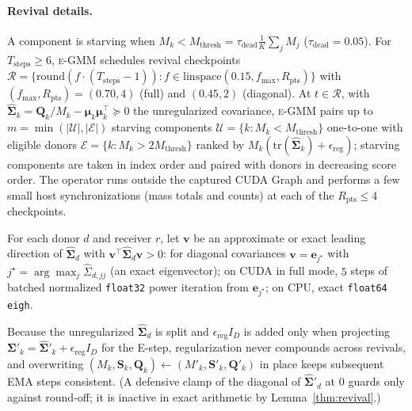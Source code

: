 \documentclass[10pt]{article} %
\newcommand{\egmm}{\textsc{e-GMM}}
\newcommand{\tr}{\mathrm{tr}}
\begin{document}
\paragraph{Revival details.} A component is starving when $M_k < M_{\mathrm{thresh}} = \tau_{\mathrm{dead}} \frac{1}{K}\sum_{j} M_j$ ($\tau_{\mathrm{dead}} = 0.05$). For $T_{\mathrm{steps}} \ge 6$, \egmm{} schedules revival checkpoints $\mathcal{R} = \{\mathrm{round}(f \cdot (T_{\mathrm{steps}} - 1)) : f \in \mathrm{linspace}(0.15, f_{\max}, R_{\mathrm{pts}})\}$ with $(f_{\max}, R_{\mathrm{pts}}) = (0.70, 4)$ (full) and $(0.45, 2)$ (diagonal). At $t \in \mathcal{R}$, with $\hat{\boldsymbol{\Sigma}}_k = \mathbf{Q}_k / M_k - \boldsymbol{\mu}_k \boldsymbol{\mu}_k^\top \succeq 0$ the unregularized covariance, \egmm{} pairs up to $m = \min(|\mathcal{U}|, |\mathcal{E}|)$ starving components $\mathcal{U} = \{k : M_k < M_{\mathrm{thresh}}\}$ one-to-one with eligible donors $\mathcal{E} = \{k : M_k > 2 M_{\mathrm{thresh}}\}$ ranked by $M_k (\tr(\hat{\boldsymbol{\Sigma}}_k) + \epsilon_{\mathrm{reg}})$; starving components are taken in index order and paired with donors in decreasing score order. The operator runs outside the captured CUDA Graph and performs a few small host synchronizations (mass totals and counts) at each of the $R_{\mathrm{pts}} \le 4$ checkpoints.

For each donor $d$ and receiver $r$, let $\mathbf{v}$ be an approximate or exact leading direction of $\hat{\boldsymbol{\Sigma}}_d$ with $\mathbf{v}^\top \hat{\boldsymbol{\Sigma}}_d \mathbf{v} > 0$: for diagonal covariances $\mathbf{v} = \mathbf{e}_{j^\star}$ with $j^\star = \arg\max_j \hat{\Sigma}_{d,jj}$ (an exact eigenvector); on CUDA in full mode, $5$ steps of batched normalized \texttt{float32} power iteration from $\mathbf{e}_{j^\star}$; on CPU, exact \texttt{float64} \texttt{eigh}.

Because the unregularized $\hat{\boldsymbol{\Sigma}}_d$ is split and $\epsilon_{\mathrm{reg}} I_D$ is added only when projecting $\boldsymbol{\Sigma}'_k = \hat{\boldsymbol{\Sigma}}'_k + \epsilon_{\mathrm{reg}} I_D$ for the E-step, regularization never compounds across revivals, and overwriting $(M_k, \mathbf{S}_k, \mathbf{Q}_k) \leftarrow (M'_k, \mathbf{S}'_k, \mathbf{Q}'_k)$ in place keeps subsequent EMA steps consistent. (A defensive clamp of the diagonal of $\hat{\boldsymbol{\Sigma}}'_d$ at $0$ guards only against round-off; it is inactive in exact arithmetic by Lemma~\ref{thm:revival}.)
\end{document}

